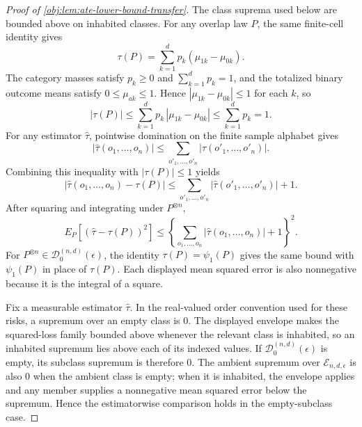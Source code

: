\documentclass[11pt]{article}
\begin{document}
\begin{proof}[Proof of \cref{obj:lem:ate-lower-bound-transfer}]
The class suprema used below are bounded above on inhabited classes.  For any overlap law \(P\), the same finite-cell identity gives
\[
\tau(P)=\sum_{k=1}^d p_k(\mu_{1k}-\mu_{0k}).
\]
The category masses satisfy \(p_k\ge0\) and \(\sum_{k=1}^d p_k=1\), and the totalized binary outcome means satisfy \(0\le\mu_{ak}\le1\).  Hence \(|\mu_{1k}-\mu_{0k}|\le1\) for each \(k\), so
\[
|\tau(P)|
\le
\sum_{k=1}^d p_k\,|\mu_{1k}-\mu_{0k}|
\le
\sum_{k=1}^d p_k
=
1.
\]
For any estimator \(\widehat\tau\), pointwise domination on the finite sample alphabet gives
\[
|\widehat\tau(o_1,\ldots,o_n)|
\le
\sum_{o'_1,\ldots,o'_n}|\widehat\tau(o'_1,\ldots,o'_n)|.
\]
Combining this inequality with \(|\tau(P)|\le1\) yields
\[
|\widehat\tau(o_1,\ldots,o_n)-\tau(P)|
\le
\sum_{o'_1,\ldots,o'_n}|\widehat\tau(o'_1,\ldots,o'_n)|+1.
\]
After squaring and integrating under \(P^{\otimes n}\),
\[
E_P\!\left[(\widehat\tau-\tau(P))^2\right]
\le
\left\{\sum_{o_1,\ldots,o_n}|\widehat\tau(o_1,\ldots,o_n)|+1\right\}^2.
\]
For \(P^{\otimes n}\in\mathcal D_0^{(n,d)}(\epsilon)\), the identity \(\tau(P)=\psi_1(P)\) gives the same bound with \(\psi_1(P)\) in place of \(\tau(P)\).  Each displayed mean squared error is also nonnegative because it is the integral of a square.

Fix a measurable estimator \(\widehat\tau\).  In the real-valued order convention used for these risks, a supremum over an empty class is \(0\).  The displayed envelope makes the squared-loss family bounded above whenever the relevant class is inhabited, so an inhabited supremum lies above each of its indexed values.  If \(\mathcal D_0^{(n,d)}(\epsilon)\) is empty, its subclass supremum is therefore \(0\).  The ambient supremum over \(\mathcal E_{n,d,\epsilon}\) is also \(0\) when the ambient class is empty; when it is inhabited, the envelope applies and any member supplies a nonnegative mean squared error below the supremum.  Hence the estimatorwise comparison holds in the empty-subclass case.


\end{proof}
\end{document}
